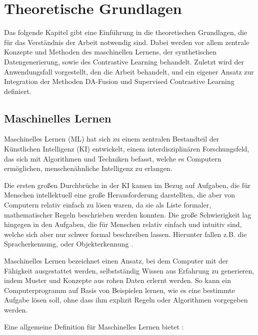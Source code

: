 \chapter{Theoretische Grundlagen} \label{ch:theory}

Das folgende Kapitel gibt eine Einführung in die theoretischen Grundlagen, die für das Verständnis der Arbeit notwendig sind. Dabei werden vor allem zentrale Konzepte und Methoden des maschinellen Lernens, der synthetischen Datengenerierung, sowie des Contrastive Learning behandelt. Zuletzt wird der Anwendungsfall vorgestellt, den die Arbeit behandelt, und ein eigener Ansatz zur Integration der Methoden DA-Fusion und Supervised Contrastive Learning definiert.

\section{Maschinelles Lernen} \label{sec:ml}

Maschinelles Lernen (ML) hat sich zu einem zentralen Bestandteil der Künstlichen Intelligenz (KI) entwickelt, einem interdisziplinären Forschungsfeld, das sich mit Algorithmen und Techniken befasst, welche es Computern ermöglichen, menschenähnliche Intelligenz zu erlangen.

Die ersten großen Durchbrüche in der KI kamen im Bezug auf Aufgaben, die für Menschen intellektuell eine große Herausforderung darstellten, die aber von Computern relativ einfach zu lösen waren, da sie als Liste formaler, mathematischer Regeln beschrieben werden konnten. Die große Schwierigkeit lag hingegen in den Aufgaben, die für Menschen relativ einfach und intuitiv sind, welche sich aber nur schwer formal beschreiben lassen. Hierunter fallen z.B. die Spracherkennung, oder Objekterkennung \parencite{Goodfellow2016deeplearning}.

Maschinelles Lernen bezeichnet einen Ansatz, bei dem Computer mit der Fähigkeit ausgestattet werden, selbstständig Wissen aus Erfahrung zu generieren, indem Muster und Konzepte aus rohen Daten erlernt werden. So kann ein Computerprogramm auf Basis von Beispielen lernen, wie es eine bestimmte Aufgabe lösen soll, ohne dass ihm explizit Regeln oder Algorithmen vorgegeben werden.

Eine allgemeine Definition für Maschinelles Lernen bietet \parencite{Mitchell1997machinelearning}:

